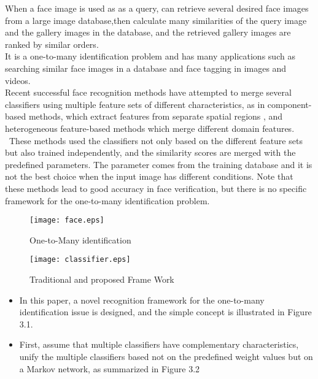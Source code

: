 When  a face image is used as as a query,  can retrieve several desired face images from a large image database,then  calculate many similarities of the query image and the
gallery images in the database, and the retrieved gallery images are ranked by similar orders. \\It is a one-to-many identification problem  and has many applications such
as searching similar face images in a database and face tagging in images and videos.\
\\Recent successful face recognition methods have attempted to merge several classifiers using multiple feature sets of different characteristics, as in component-based methods, which extract features from separate spatial regions , and heterogeneous feature-based methods which merge different domain features. \ These methods used the classifiers not only based on the different feature sets but also trained independently, and the similarity scores are merged with the predefined parameters. The parameter comes from the training database and it is not the best choice when the input image has different conditions. Note that these methods lead to good accuracy in face verification, but there is no specific framework for the one-to-many identification problem.
\begin{figure}
  \texttt{[image: face.eps]}\\
  \caption{One-to-Many identification }\label{}
\end{figure}
\begin{figure}
  \texttt{[image: classifier.eps]}\\
  \caption{Traditional and proposed Frame Work}\label{}
\end{figure}

 \begin{itemize}
   \item In this paper, a novel recognition framework for the one-to-many identification issue is designed, and the simple concept is illustrated in Figure 3.1.
   \item First, assume that multiple classifiers have complementary characteristics, unify the multiple classifiers based not on the predefined weight values but on a Markov network, as summarized in Figure 3.2
 \end{itemize}

